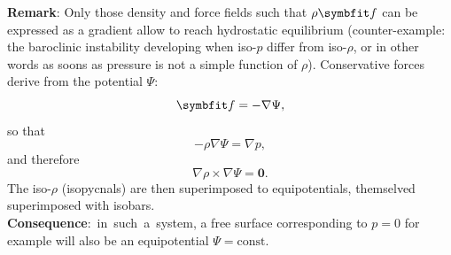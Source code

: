 \textbf{Remark}: Only those density and force fields such that $\rho \bff$ can be expressed as a gradient allow to reach hydrostatic equilibrium (counter-example: the baroclinic instability developing when iso-$p$ differ from iso-$\rho$, or in other words as soons as pressure is not a simple function of $\rho$).
 Conservative forces derive from the potential $\Psi$:
\begin{equation}
\bff = - \nabla \Psi,
\end{equation}
so that
\begin{equation}
-\rho \nabla \Psi = \nabla p,
\end{equation}
and therefore 
\begin{equation}
\nabla \rho \times \nabla \Psi = \boldsymbol 0.
\end{equation}
The iso-$\rho$ (isopycnals) are then superimposed to equipotentials, themselved superimposed with isobars. \\
\textbf{Consequence}:~in~such~a~system, a free surface corresponding to  $p = 0$ for example will also be an equipotential $\Psi = \text{const}$.

